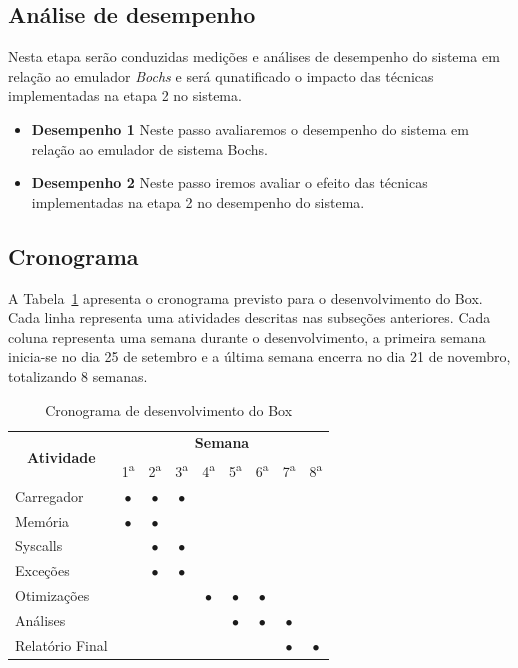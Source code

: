 \documentclass[11pt,twoside]{article}
\begin{document}
\subsection{Análise de desempenho}

Nesta etapa serão conduzidas medições e análises de desempenho do sistema em relação ao emulador \emph{Bochs} e será qunatificado o impacto das técnicas implementadas na etapa 2 no sistema.

\begin{itemize}
 \item \textbf{Desempenho 1} Neste passo avaliaremos o desempenho do sistema em relação ao emulador de sistema Bochs.
 \item \textbf{Desempenho 2} Neste passo iremos avaliar o efeito das técnicas implementadas na etapa 2 no desempenho do sistema.
\end{itemize}

 
\subsection{Cronograma}

A Tabela~\ref{tab:cronograma} apresenta o cronograma previsto para o desenvolvimento do Box.
Cada linha representa uma atividades descritas nas subseções anteriores. Cada coluna representa
uma semana durante o desenvolvimento, a primeira semana inicia-se no dia 25 de setembro e a
última semana encerra no dia 21 de novembro, totalizando 8 semanas.

\begin{table}[h]
\centering
\begin{tabular}{|l|c|c|c|c|c|c|c|c|} \hline
\multicolumn{1}{|c|}{\multirow{2}{*}{\textbf{Atividade}}} & \multicolumn{8}{c|}{\textbf{Semana}} \\ \cline{2-9}
\multicolumn{1}{|c|}{} & 1\textsuperscript{a} & 2\textsuperscript{a} & 3\textsuperscript{a} & 4\textsuperscript{a} & 5\textsuperscript{a} & 6\textsuperscript{a} & 7\textsuperscript{a} & 8\textsuperscript{a} \\ \hline
Carregador  	& $\bullet$ & $\bullet$ & $\bullet$ &  &  &  &  &  \\ \hline
Memória     	& $\bullet$ & $\bullet$ & &  &  &  &  &  \\ \hline
Syscalls    	&  & $\bullet$ & $\bullet$ &  &  &  &  &  \\ \hline
Exceções    	&  & $\bullet$ & $\bullet$ &  &  &  &  &  \\ \hline
Otimizações 	&  &  &  & $\bullet$ & $\bullet$ & $\bullet$ &  &  \\ \hline
Análises    	&  &  &  &  & $\bullet$ & $\bullet$ & $\bullet$ &  \\ \hline
Relatório Final	&  &  &  &  &  &  & $\bullet$ & $\bullet$ \\ \hline
\end{tabular}
\caption{Cronograma de desenvolvimento do Box}
\label{tab:cronograma}
\end{table}
\end{document}
